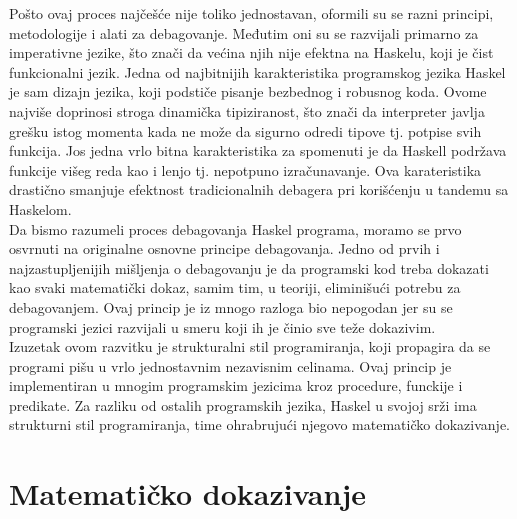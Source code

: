 \documentclass[a4paper]{article}
\begin{document}
{{Pošto ovaj proces najčešće nije toliko jednostavan, oformili su se razni principi, metodologije i alati za debagovanje. Međutim oni su se razvijali primarno za imperativne jezike, što znači da većina njih nije efektna na Haskelu, koji je čist funkcionalni jezik. Jedna od najbitnijih karakteristika programskog jezika Haskel je sam dizajn jezika, koji podstiče pisanje bezbednog i robusnog koda. Ovome najviše doprinosi stroga dinamička tipiziranost, što znači da interpreter javlja grešku istog momenta kada ne može da sigurno odredi tipove tj. potpise svih funkcija. Jos jedna vrlo bitna karakteristika za spomenuti je da Haskell podržava funkcije višeg reda kao i lenjo tj. nepotpuno izračunavanje. Ova karateristika drastično smanjuje efektnost tradicionalnih debagera pri korišćenju u tandemu sa Haskelom. \cite{pope2006declarative}\\

Da bismo razumeli proces debagovanja Haskel programa, moramo se prvo osvrnuti na originalne osnovne principe debagovanja. Jedno od prvih i najzastupljenijih mišljenja o debagovanju je da programski kod treba dokazati kao svaki matematički dokaz, samim tim, u teoriji, eliminišući potrebu za debagovanjem. Ovaj princip je iz mnogo razloga bio nepogodan jer su se programski jezici razvijali u smeru koji ih je činio sve teže dokazivim.\cite{pope2006declarative} \\

Izuzetak ovom razvitku je strukturalni stil programiranja, koji propagira da se programi pišu u vrlo jednostavnim nezavisnim celinama. Ovaj princip je implementiran u mnogim programskim jezicima kroz procedure, funckije i predikate. Za razliku od ostalih programskih jezika, Haskel u svojoj srži ima strukturni stil programiranja, time ohrabrujući njegovo matematičko dokazivanje.\cite{pope2006declarative}

\section{Matematičko dokazivanje}

}}
\end{document}
